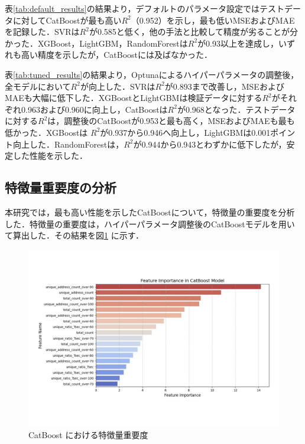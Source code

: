 表\ref{tab:default_results}の結果より，デフォルトのパラメータ設定ではテストデータに対してCatBoostが最も高い$R^2$（0.952）を示し，最も低いMSEおよびMAEを記録した．SVRは$R^2$が0.585と低く，他の手法と比較して精度が劣ることが分かった．XGBoost，LightGBM，RandomForestは$R^2$が0.93以上を達成し，いずれも高い精度を示したが，CatBoostには及ばなかった．

表\ref{tab:tuned_results}の結果より，Optunaによるハイパーパラメータの調整後，全モデルにおいて$R^2$が向上した．SVRは$R^2$が0.893まで改善し，MSEおよびMAEも大幅に低下した．XGBoostとLightGBMは検証データに対する$R^2$がそれぞれ0.963および0.960に向上し，CatBoostは$R^2$が0.968となった．テストデータに対する$R^2$は，調整後のCatBoostが0.953と最も高く，MSEおよびMAEも最も低かった．XGBoostは $R^2$が0.937から0.946へ向上し，LightGBMは0.001ポイント向上した．RandomForestは，$R^2$が0.944から0.943とわずかに低下したが，安定した性能を示した．

\subsection{特徴量重要度の分析}
本研究では，最も高い性能を示したCatBoostについて，特徴量の重要度を分析した．特徴量の重要度は，ハイパーパラメータ調整後のCatBoostモデルを用いて算出した．その結果を図\ref{fig:feature_importance} に示す．
\begin{figure}[htbp]
    \centering
    \includegraphics[width=1.2\linewidth]{./fig/feature_importance.pdf}
    \caption{CatBoost における特徴量重要度}
    \label{fig:feature_importance}
\end{figure}

